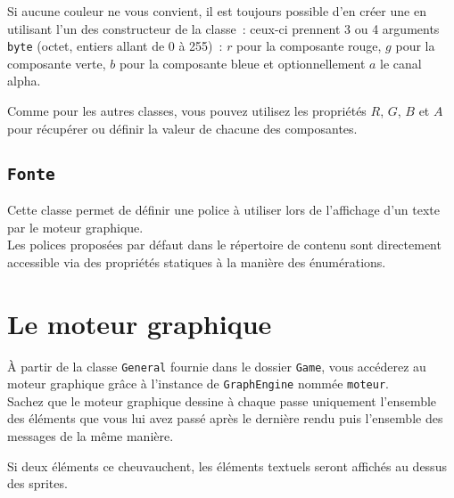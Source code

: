 Si aucune couleur ne vous convient, il est toujours possible d'en créer une en utilisant l'un des constructeur de la classe~: ceux-ci prennent 3 ou 4 arguments \texttt{byte} (octet, entiers allant de 0 à 255)~: $r$ pour la composante rouge, $g$ pour la composante verte, $b$ pour la composante bleue et optionnellement $a$ le canal alpha.

Comme pour les autres classes, vous pouvez utilisez les propriétés $R$, $G$, $B$ et $A$ pour récupérer ou définir la valeur de chacune des composantes.

\subsection{\texttt{Fonte}}

Cette classe permet de définir une police à utiliser lors de l'affichage d'un texte par le moteur graphique.\\

Les polices proposées par défaut dans le répertoire de contenu sont directement accessible via des propriétés statiques à la manière des énumérations.

\section{Le moteur graphique}

À partir de la classe \texttt{General} fournie dans le dossier \texttt{Game}, vous accéderez au moteur graphique grâce à l'instance de \texttt{GraphEngine} nommée \texttt{moteur}.\\

Sachez que le moteur graphique dessine à chaque passe uniquement l'ensemble des éléments que vous lui avez passé après le dernière rendu puis l'ensemble des messages de la même manière.

Si deux éléments ce cheuvauchent, les éléments textuels seront affichés au dessus des sprites.




